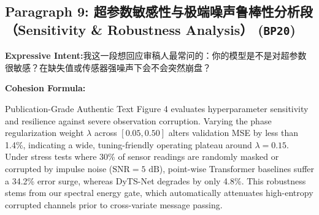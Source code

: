 \subsection*{Paragraph 9: 超参数敏感性与极端噪声鲁棒性分析段（Sensitivity \& Robustness Analysis） (\texttt{BP20})}
\noindent\textbf{Expressive Intent:}\enspace 我这一段想回应审稿人最常问的：你的模型是不是对超参数很敏感？在缺失值或传感器强噪声下会不会突然崩盘？\par
\noindent\textbf{Cohesion Formula:}\par\vspace{4pt}
\begin{ExampleBox}{Publication-Grade Authentic Text}
Figure 4 evaluates hyperparameter sensitivity and resilience against severe observation corruption. Varying the phase regularization weight $\lambda$ across $[0.05, 0.50]$ alters validation MSE by less than 1.4\%, indicating a wide, tuning-friendly operating plateau around $\lambda=0.15$. Under stress tests where 30\% of sensor readings are randomly masked or corrupted by impulse noise ($\text{SNR} = 5\text{ dB}$), point-wise Transformer baselines suffer a 34.2\% error surge, whereas DyTS-Net degrades by only 4.8\%. This robustness stems from our spectral energy gate, which automatically attenuates high-entropy corrupted channels prior to cross-variate message passing.
\end{ExampleBox}
